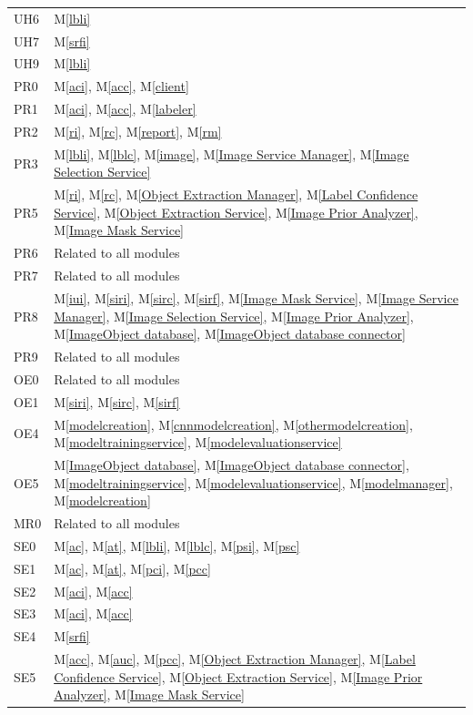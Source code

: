 \documentclass[12pt, titlepage]{article}
\newcommand{\mref}[1]{M\ref{#1}}
\begin{document}
\begin{longtable}{p{} p{}}
  UH6 & \mref{lbli} \\
  UH7 & \mref{srfi} \\
  UH9 & \mref{lbli} \\
  PR0 & \mref{aci}, \mref{acc}, \mref{client} \\
  PR1 & \mref{aci}, \mref{acc}, \mref{labeler} \\
  PR2 & \mref{ri}, \mref{rc}, \mref{report}, \mref{rm} \\
  PR3 & \mref{lbli}, \mref{lblc}, \mref{image}, \mref{Image Service Manager}, \mref{Image Selection Service} \\
  PR5 &  \mref{ri}, \mref{rc}, \mref{Object Extraction Manager}, \mref{Label Confidence Service}, \mref{Object Extraction Service}, \mref{Image Prior Analyzer}, \mref{Image Mask Service}\\
  PR6 & Related to all modules \\
  PR7 & Related to all modules \\
  PR8 & \mref{iui}, \mref{siri}, \mref{sirc}, \mref{sirf}, \mref{Image Mask Service}, \mref{Image Service Manager}, \mref{Image Selection Service}, \mref{Image Prior Analyzer}, \mref{ImageObject database}, \mref{ImageObject database connector} \\
  PR9 & Related to all modules \\
  OE0 & Related to all modules \\
  OE1 & \mref{siri}, \mref{sirc}, \mref{sirf} \\
  OE4 &  \mref{modelcreation}, \mref{cnnmodelcreation}, \mref{othermodelcreation}, \mref{modeltrainingservice}, \mref{modelevaluationservice} \\
  OE5 &  \mref{ImageObject database}, \mref{ImageObject database connector}, \mref{modeltrainingservice}, \mref{modelevaluationservice}, \mref{modelmanager}, \mref{modelcreation}\\
  MR0 & Related to all modules \\
  SE0 & \mref{ac}, \mref{at}, \mref{lbli}, \mref{lblc}, \mref{psi}, \mref{psc} \\
  SE1 & \mref{ac}, \mref{at}, \mref{pci}, \mref{pcc} \\
  SE2 & \mref{aci}, \mref{acc} \\
  SE3 & \mref{aci}, \mref{acc} \\
  SE4 & \mref{srfi} \\
  SE5 & \mref{acc}, \mref{auc}, \mref{pcc}, \mref{Object Extraction Manager}, \mref{Label Confidence Service}, \mref{Object Extraction Service}, \mref{Image Prior Analyzer}, \mref{Image Mask Service}\\

\end{longtable}
\end{document}
